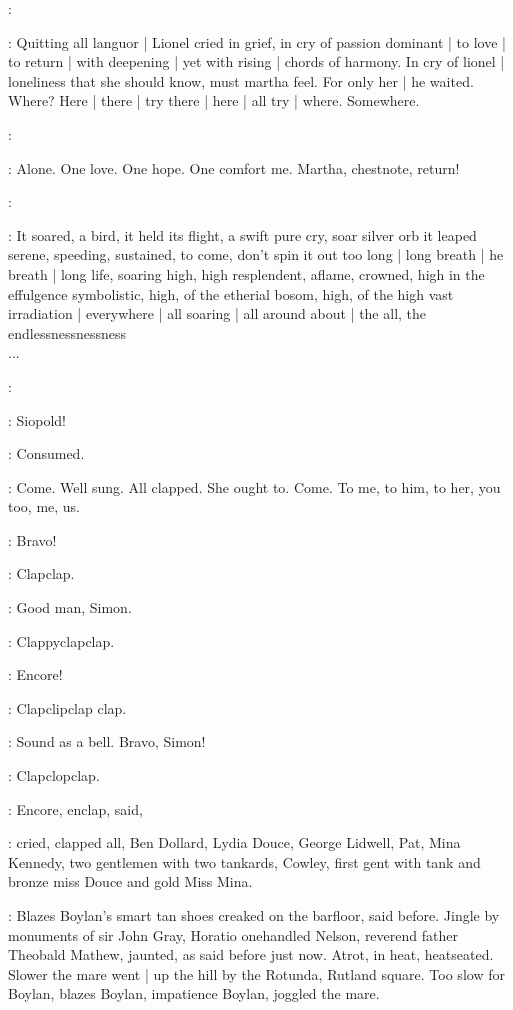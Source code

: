 \simon:

:
Quitting all languor |
Lionel cried in grief,
in cry of passion dominant |
to love |
to return |
with deepening |
yet with rising |
chords of harmony.
In cry of lionel |
loneliness that she should know,
must martha feel.
For only her |
he waited.
Where?
Here |
there |
try there |
here |
all try |
where.
Somewhere.

\simon:

:
Alone.
One love.
One hope.
One comfort me.
Martha,
chestnote,
return!

\simon:

:
It soared,
a bird,
it held its flight,
a swift pure cry,
soar silver orb
it leaped serene,
speeding,
sustained,
to come,
don't spin it out too long |
long breath |
he breath |
long life,
soaring high,
high resplendent,
aflame,
crowned,
high in the effulgence symbolistic,
high, of the etherial bosom,
high, of the high vast irradiation |
everywhere |
all soaring |
all around about |
the all,
the endlessnessnessness%
\\
...

\simon:

:
Siopold!

\BloomInt:
Consumed.

\BloomInt:
Come.
Well sung.
All clapped.
She ought to.
Come.
To me,
to him,
to her,
you too,
me,
us.

\lenehan:
Bravo!

:
Clapclap.

\dollard:
Good man,
Simon.

:
Clappyclapclap.

\cowley:
Encore!

:
Clapclipclap clap.

\lenehan:
Sound as a bell.
Bravo,
Simon!

:
Clapclopclap.

:
Encore,
enclap,
said,

:
cried,
clapped all,
Ben Dollard,
Lydia Douce,
George
Lidwell,
Pat,
Mina Kennedy,
two gentlemen with two tankards,
Cowley,
first gent with tank and bronze miss Douce
and gold Miss Mina.

:
Blazes Boylan's smart tan shoes creaked on the barfloor,
said before.
Jingle by monuments of sir John Gray,
Horatio onehandled Nelson,
reverend father Theobald Mathew,
jaunted,
as said before just now.
Atrot,
in heat,
heatseated.
Slower the mare went |
up the hill by the Rotunda,
Rutland square.
Too slow for Boylan,
blazes Boylan,
impatience Boylan,
joggled the mare.

